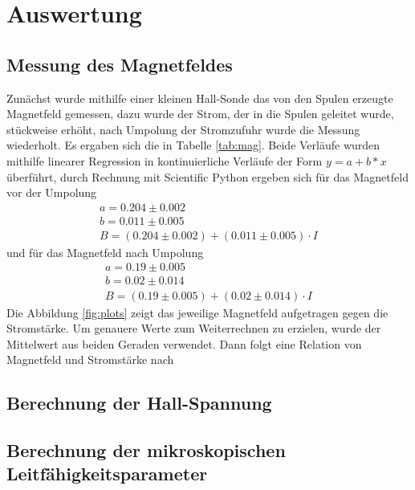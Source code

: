 \section{Auswertung}
\label{sec:Auswertung}

\subsection{Messung des Magnetfeldes}
Zunächst wurde mithilfe einer kleinen Hall-Sonde das von den Spulen erzeugte Magnetfeld gemessen, dazu wurde der Strom, der in die Spulen geleitet wurde, stückweise erhöht, 
nach Umpolung der Stromzufuhr wurde die Messung wiederholt. Es ergaben sich die in Tabelle \ref{tab:mag}.
% 
Beide Verläufe wurden mithilfe linearer Regression in kontinuierliche Verläufe der Form $y = a + b*x$ überführt, durch Rechnung mit Scientific Python ergeben sich für das 
Magnetfeld vor der Umpolung
\begin{align*}
a = 0.204 \pm 0.002\\
b = 0.011 \pm 0.005\\
B = (0.204 \pm 0.002) + (0.011 \pm 0.005) \cdot I
\end{align*}
und für das Magnetfeld nach Umpolung
\begin{align*}
a = 0.19 \pm 0.005\\
b = 0.02 \pm 0.014\\
B = (0.19 \pm 0.005) + (0.02 \pm 0.014) \cdot I
\end{align*}
Die Abbildung \ref{fig:plots} zeigt das jeweilige Magnetfeld aufgetragen gegen die Stromstärke. 
Um genauere Werte zum Weiterrechnen zu erzielen, wurde der Mittelwert aus
beiden Geraden verwendet. Dann folgt eine Relation von Magnetfeld und Stromstärke nach
%

\subsection{Berechnung der Hall-Spannung}


\subsection{Berechnung der mikroskopischen Leitfähigkeitsparameter}